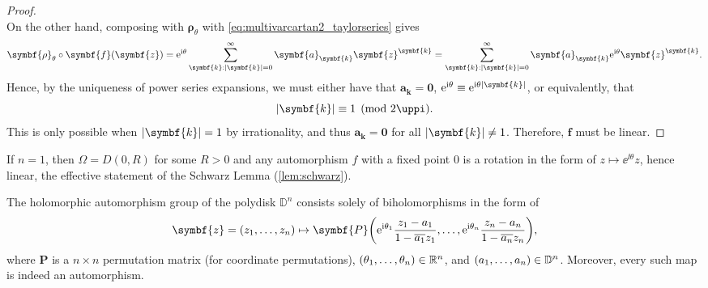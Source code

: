 \begin{proof}
\begin{equation*}
    \end{equation*}
    On the other hand, composing with \(\symbf{\rho}_\theta\) with \cref{eq:multivarcartan2_taylorseries} gives
    \begin{equation*}
        \symbf{\rho}_\theta\circ\symbf{f}(\symbf{z})=\ee^{\ii\theta}\sum_{\symbf{k}:\abs{\symbf{k}}=0}^\infty\symbf{a}_{\symbf{k}}\symbf{z}^{\symbf{k}}=\sum_{\symbf{k}:\abs{\symbf{k}}=0}^\infty\symbf{a}_{\symbf{k}}\ee^{\ii\theta}\symbf{z}^{\symbf{k}}.
    \end{equation*}
    Hence, by the uniqueness of power series expansions, we must either have that \(\symbf{a}_{\symbf{k}}=\symbf{0}\), \(\ee^{\ii\theta}\equiv\ee^{\ii\theta\abs{\symbf{k}}}\), or equivalently, that \[\abs{\symbf{k}}\equiv 1\pmod{2\uppi}.\] This is only possible when \(\abs{\symbf{k}}=1\) by irrationality, and thus \(\symbf{a}_{\symbf{k}}=\symbf{0}\) for all \(\abs{\symbf{k}}\neq 1\). Therefore, \(\symbf{f}\) must be linear.
\end{proof}
\begin{remark}
    If \(n=1\), then \(\Omega=D(0,R)\) for some \(R>0\) and any automorphism \(f\) with a fixed point \(0\) is a rotation in the form of \(z\mapsto\ee^{\ii\theta}z\), hence linear, the effective statement of the Schwarz Lemma (\cref{lem:schwarz}).
\end{remark}
\begin{theorem}\label{thm:holomorphicautomorphismgrouponpolydisk}
    The holomorphic automorphism group of the polydisk \(\mathbb{D}^n\) consists solely of biholomorphisms in the form of
    \begin{equation}
        \symbf{z}=\qty(z_1,\ldots,z_n)\mapsto\symbf{P}\qty(\ee^{\ii\theta_1}\frac{z_1-a_1}{1-\overline{a_1}z_1},\ldots,\ee^{\ii\theta_n}\frac{z_n-a_n}{1-\overline{a_n}z_n}),\label{eq:holomorphicautomorphismgrouponpolydisk_statement}
    \end{equation} where \(\symbf{P}\) is a \(n\times n\) permutation matrix (for coordinate permutations), \(\qty(\theta_1,\dots,\theta_n)\in\mathbb{R}^n\), and \(\qty(a_1,\ldots,a_n)\in\mathbb{D}^n\). Moreover, every such map is indeed an automorphism.
\end{theorem}
